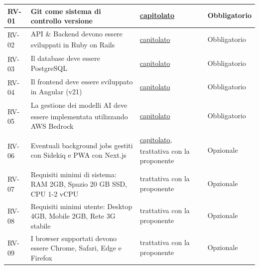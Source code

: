 ﻿\documentclass[a4paper,11pt]{article}
\newcommand{\urlcap}{https://www.math.unipd.it/~tullio/IS-1/2025/Progetto/C5.pdf}
\begin{document}
\begin{longtable}{|L{\wCod}|L{\wDesc}|L{\wFonti}|L{\wPrio}|}
    RV-01 & Git come sistema di controllo versione & \href{\urlcap}{capitolato\textsubscript{}} & Obbligatorio\textsubscript{} \\
    \hline
    RV-02 & API\textsubscript{} \& Backend devono essere sviluppati in Ruby on Rails\textsubscript{} & \href{\urlcap}{capitolato\textsubscript{}} & Obbligatorio\textsubscript{} \\
    \hline
    RV-03 & Il database deve essere PostgreSQL\textsubscript{} & \href{\urlcap}{capitolato\textsubscript{}} & Obbligatorio\textsubscript{} \\
    \hline
    RV-04 & Il frontend deve essere sviluppato in Angular\textsubscript{} (v21) & \href{\urlcap}{capitolato\textsubscript{}} & Obbligatorio\textsubscript{} \\
    \hline
    RV-05 & La gestione dei modelli AI\textsubscript{} deve essere implementata utilizzando AWS Bedrock\textsubscript{} & \href{\urlcap}{capitolato\textsubscript{}} & Obbligatorio\textsubscript{} \\
    \hline
    RV-06 & Eventuali background jobs gestiti con Sidekiq e PWA\textsubscript{} con Next.js & \href{\urlcap}{capitolato\textsubscript{}}, trattativa con la proponente\textsubscript{} & Opzionale\textsubscript{} \\
    \hline
    RV-07 & Requisiti minimi di sistema: RAM 2GB, Spazio 20 GB SSD, CPU 1-2 vCPU  & trattativa con la proponente\textsubscript{} & Opzionale\textsubscript{} \\
    \hline
    RV-08 & Requisiti minimi utente: Desktop 4GB, Mobile 2GB, Rete 3G stabile  & trattativa con la proponente\textsubscript{} & Opzionale\textsubscript{} \\
    \hline
    RV-09 & I browser supportati devono essere Chrome, Safari, Edge e Firefox & trattativa con la proponente\textsubscript{} & Opzionale\textsubscript{} \\
    \hline

\end{longtable}
\end{document}
